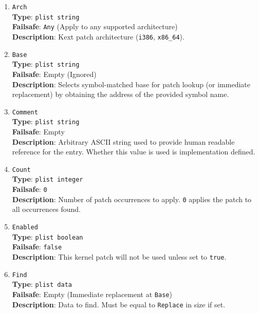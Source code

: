 \documentclass[]{article}
\begin{document}
\begin{enumerate}
\item
  \texttt{Arch}\\
  \textbf{Type}: \texttt{plist\ string}\\
  \textbf{Failsafe}: \texttt{Any} (Apply to any supported architecture)\\
  \textbf{Description}: Kext patch architecture (\texttt{i386}, \texttt{x86\_64}).

\item
  \texttt{Base}\\
  \textbf{Type}: \texttt{plist\ string}\\
  \textbf{Failsafe}: Empty (Ignored)\\
  \textbf{Description}: Selects symbol-matched base for patch lookup (or immediate
  replacement) by obtaining the address of the provided symbol name.

\item
  \texttt{Comment}\\
  \textbf{Type}: \texttt{plist\ string}\\
  \textbf{Failsafe}: Empty\\
  \textbf{Description}: Arbitrary ASCII string used to provide human readable
  reference for the entry. Whether this value is used is implementation defined.

\item
  \texttt{Count}\\
  \textbf{Type}: \texttt{plist\ integer}\\
  \textbf{Failsafe}: \texttt{0}\\
  \textbf{Description}: Number of patch occurrences to apply. \texttt{0} applies
  the patch to all occurrences found.

\item
  \texttt{Enabled}\\
  \textbf{Type}: \texttt{plist\ boolean}\\
  \textbf{Failsafe}: \texttt{false}\\
  \textbf{Description}: This kernel patch will not be used unless set to
  \texttt{true}.

\item
  \texttt{Find}\\
  \textbf{Type}: \texttt{plist\ data}\\
  \textbf{Failsafe}: Empty (Immediate replacement at \texttt{Base})\\
  \textbf{Description}: Data to find. Must be equal to \texttt{Replace}
  in size if set.


\end{enumerate}
\end{document}
